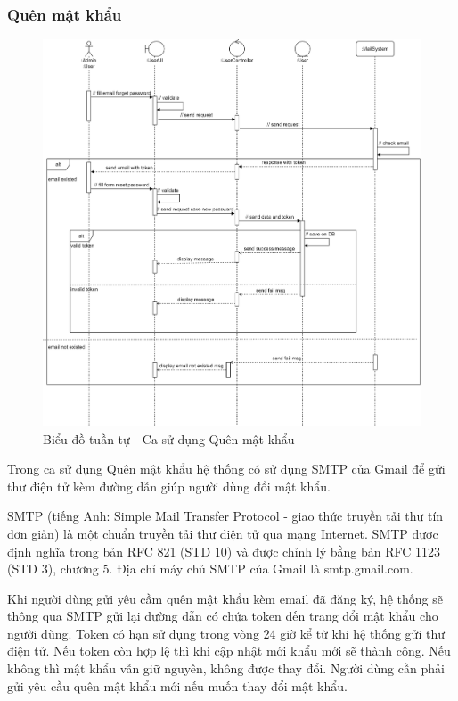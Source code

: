 \documentclass[./../main.tex]{subfiles}
\begin{document}
\subsubsection{Quên mật khẩu}
\begin{figure}[H]
	\centering
	\includegraphics[width=\linewidth]{./img/uc3.png}
	\caption{Biểu đồ tuần tự - Ca sử dụng Quên mật khẩu}
\end{figure}

Trong ca sử dụng Quên mật khẩu hệ thống có sử dụng SMTP của Gmail để gửi thư điện tử kèm đường dẫn giúp người dùng đổi mật khẩu.

SMTP \cite{smtp} (tiếng Anh: Simple Mail Transfer Protocol - giao thức truyền tải thư tín đơn giản) là một chuẩn truyền tải thư điện tử qua mạng Internet. SMTP được định nghĩa trong bản RFC 821 (STD 10) và được chỉnh lý bằng bản RFC 1123 (STD 3), chương 5. Địa chỉ máy chủ SMTP của Gmail là smtp.gmail.com.

Khi người dùng gửi yêu cầm quên mật khẩu kèm email đã đăng ký, hệ thống sẽ thông qua SMTP gửi lại đường dẫn có chứa token đến trang đổi mật khẩu cho người dùng. Token có hạn sử dụng trong vòng 24 giờ kể từ khi hệ thống gửi thư điện tử. Nếu token còn hợp lệ thì khi cập nhật mới khẩu mới sẽ thành công. Nếu không thì mật khẩu vẫn giữ nguyên, không được thay đổi. Người dùng cần phải gửi yêu cầu quên mật khẩu mới nếu muốn thay đổi mật khẩu.
\end{document}
